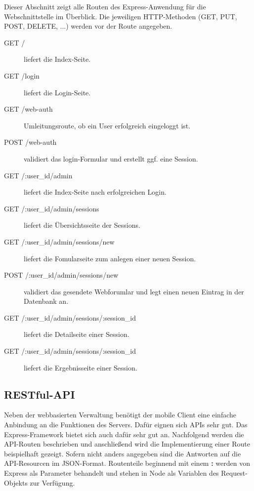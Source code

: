 Dieser Abschnitt zeigt alle Routen des Express-Anwendung für die Webschnittstelle im Überblick. 
Die jeweiligen \ac{HTTP}-Methoden (GET, PUT, POST, DELETE, ...) werden vor der Route angegeben.

\begin{description}

	\item[GET /] liefert die Index-Seite.
	\item[GET /login] liefert die Login-Seite.

	\item[GET /web-auth] Umleitungsroute, ob ein User erfolgreich eingeloggt ist.
	\item[POST /web-auth] validiert das login-Formular und erstellt ggf. eine Session.
	\item[GET /:user\_id/admin] liefert die Index-Seite nach erfolgreichen Login.
	\item[GET /:user\_id/admin/sessions] liefert die Übersichtsseite der Sessions.
	\item[GET /:user\_id/admin/sessions/new] liefert die Fomularseite zum anlegen einer neuen Session.
	\item[POST /:user\_id/admin/sessions/new] validiert das gesendete Webforumlar und legt einen neuen Eintrag in der Datenbank an.
	\item[GET /:user\_id/admin/sessions/:session\_id] liefert die Detailseite einer Session.
	\item[GET /:user\_id/admin/sessions/:session\_id] liefert die Ergebnisseite einer Session.
	
	
\end{description}

\subsection{RESTful-API \label{sec: api}}

Neben der webbasierten Verwaltung benötigt der mobile Client eine einfache Anbindung an die Funktionen des Servers. 
Dafür eignen sich \ac{API}s sehr gut. 
Das Express-Framework bietet sich auch dafür sehr gut an. 
Nachfolgend werden die \ac{API}-Routen beschrieben und anschließend wird die Implementierung einer Route beispielhaft gezeigt. 
Sofern nicht anders angegeben sind die Antworten auf die \ac{API}-Resourcen im \ac{JSON}-Format. 
Routenteile beginnend mit einem \textbf{:} werden von Express als Parameter behandelt und stehen in Node als Variablen des Request-Objekts zur Verfügung. 

